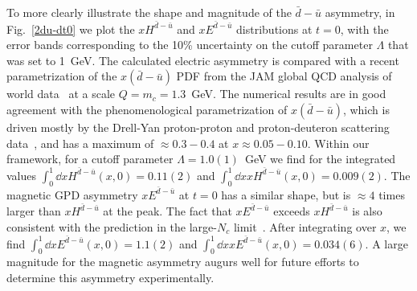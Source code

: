 \documentclass[preprintnumbers,prd,superscriptaddress,preprint]{revtex4-1}
\begin{document}
To more clearly illustrate the shape and magnitude of the $\bar{d}-\bar{u}$ asymmetry, in Fig.~\ref{2du-dt0} we plot the $xH^{\bar{d}-\bar{u}}$ and $xE^{\bar{d}-\bar{u}}$ distributions at $t=0$, with the error bands corresponding to the 10\% uncertainty on the cutoff parameter $\Lambda$ that was set to 1~GeV.
The calculated electric asymmetry is compared with a recent parametrization of the $x(\bar d-\bar u)$ PDF from the JAM global QCD analysis of world data~\cite{Cocuzza:2021cbi} at a scale $Q=m_c=1.3$~GeV.
%
%
The numerical results are in good agreement with the phenomenological parametrization of $x(\bar d-\bar u)$, which is driven mostly by the Drell-Yan proton-proton and proton-deuteron scattering data~\cite{Towell:2001nh, SeaQuest:2021zxb}, and has a maximum of $\approx 0.3-0.4$ at $x \approx 0.05-0.10$.
%
Within our framework, for a cutoff parameter $\Lambda=1.0(1)$~GeV we find for the integrated values
    $\int_0^1 \dd{x} H^{\bar{d}-\bar{u}}(x,0) = 0.11(2)$ and 
    $\int_0^1 \dd{x} xH^{\bar{d}-\bar{u}}(x,0) = 0.009(2)$.
%
The magnetic GPD asymmetry $xE^{\bar{d}-\bar{u}}$ at $t=0$ has a similar shape, but is $\approx 4$ times larger than $xH^{\bar{d}-\bar{u}}$ at the peak. The fact that $xE^{\bar{d}-\bar{u}}$ exceeds $xH^{\bar{d}-\bar{u}}$ is also consistent with the prediction in the large-$N_c$ limit~\cite{Goeke:2001tz}.
After integrating over $x$, we find
    $\int_0^1 \dd{x} E^{\bar{d}-\bar{u}}(x,0) = 1.1(2)$ and
    $\int_0^1 \dd{x} xE^{\bar{d}-\bar{u}}(x,0) = 0.034(6)$.
A large magnitude for the magnetic asymmetry augurs well for future efforts to determine this asymmetry experimentally.
\end{document}
